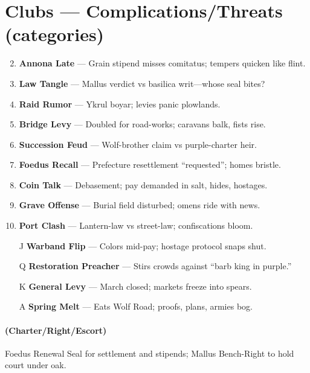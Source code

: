\section*{Clubs --- Complications/Threats (categories)}
\label{sec:vilikari-complications}
\begin{enumerate}
\setcounter{enumi}{1}
\item \textbf{Annona Late} --- Grain stipend misses comitatus; tempers quicken like flint.
\item \textbf{Law Tangle} --- Mallus verdict vs basilica writ---whose seal bites?
\item \textbf{Raid Rumor} --- Ykrul boyar; levies panic plowlands.
\item \textbf{Bridge Levy} --- Doubled for road-works; caravans balk, fists rise.
\item \textbf{Succession Feud} --- Wolf-brother claim vs purple-charter heir.
\item \textbf{Foedus Recall} --- Prefecture resettlement ``requested''; homes bristle.
\item \textbf{Coin Talk} --- Debasement; pay demanded in salt, hides, hostages.
\item \textbf{Grave Offense} --- Burial field disturbed; omens ride with news.
\item \textbf{Port Clash} --- Lantern-law vs street-law; confiscations bloom.
\item[J] \textbf{Warband Flip} --- Colors mid-pay; hostage protocol snaps shut.
\item[Q] \textbf{Restoration Preacher} --- Stirs crowds against ``barb king in purple.''
\item[K] \textbf{General Levy} --- March closed; markets freeze into spears.
\item[A] \textbf{Spring Melt} --- Eats Wolf Road; proofs, plans, armies bog.
\end{enumerate}

\paragraph*{(Charter/Right/Escort)} Foedus Renewal Seal for settlement and stipends; Mallus Bench-Right to hold court under oak.

